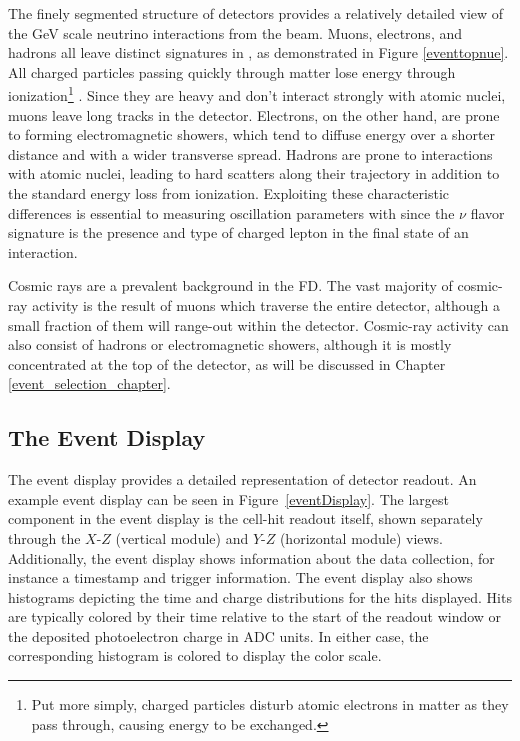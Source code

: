 The finely segmented structure of \nova detectors provides a relatively
detailed view of the GeV scale neutrino interactions from the \numi beam.
Muons, electrons, and hadrons all leave distinct signatures in \nova,
as demonstrated in Figure \ref{eventtopnue}.
All charged particles passing quickly through matter lose energy through
ionization\footnote{
Put more simply, charged particles disturb atomic electrons in matter
as they pass through, causing energy to be exchanged.
} \cite{pdg}.
Since they are heavy and don't interact strongly with atomic nuclei,
muons leave long tracks in the detector.
Electrons, on the other hand, are prone to forming electromagnetic showers,
which tend to diffuse
energy over a shorter distance and with a wider transverse spread.
Hadrons are prone to interactions with atomic nuclei, leading to
hard scatters along their trajectory in addition to the standard energy loss
from ionization.  Exploiting these characteristic differences is essential
to measuring oscillation parameters with \nova since the $\nu$ flavor signature
is the presence and type of charged lepton in the final state of an
interaction.

Cosmic rays are a prevalent background in the \nova FD.
The vast majority of cosmic-ray activity is the result of muons which traverse
the entire detector, although a small fraction of them will range-out within
the detector.
Cosmic-ray activity can also consist of hadrons or electromagnetic showers,
although it is mostly concentrated at the top of the detector, as will
be discussed in Chapter \ref{event_selection_chapter}.

\subsection{The \nova Event Display}

The \nova event display provides a detailed representation of \nova detector
readout.
An example event display can be seen in Figure~\ref{eventDisplay}.
The largest component in the event display is the cell-hit readout itself,
shown separately through the $X$-$Z$ (vertical module) and $Y$-$Z$ (horizontal
module) views.
Additionally, the event display shows information about the data collection,
for instance a timestamp and trigger information.
The event display also shows histograms depicting the time and charge
distributions for the hits displayed.
Hits are typically colored by their time relative to the start of the readout
window or the deposited photoelectron charge in ADC units.
In either case, the corresponding histogram is colored to display
the color scale.

